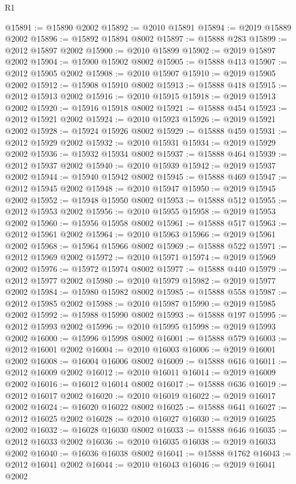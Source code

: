 \begin{lexlean}{R1}
\begin{coremodule}
@15891 := @15890 @2002
@15892 := @2010 @15891
@15894 := @2019 @15889 @2002
@15896 := @15892 @15894 @8002
@15897 := @15888 @283
@15899 := @2012 @15897 @2002
@15900 := @2010 @15899
@15902 := @2019 @15897 @2002
@15904 := @15900 @15902 @8002
@15905 := @15888 @413
@15907 := @2012 @15905 @2002
@15908 := @2010 @15907
@15910 := @2019 @15905 @2002
@15912 := @15908 @15910 @8002
@15913 := @15888 @418
@15915 := @2012 @15913 @2002
@15916 := @2010 @15915
@15918 := @2019 @15913 @2002
@15920 := @15916 @15918 @8002
@15921 := @15888 @454
@15923 := @2012 @15921 @2002
@15924 := @2010 @15923
@15926 := @2019 @15921 @2002
@15928 := @15924 @15926 @8002
@15929 := @15888 @459
@15931 := @2012 @15929 @2002
@15932 := @2010 @15931
@15934 := @2019 @15929 @2002
@15936 := @15932 @15934 @8002
@15937 := @15888 @464
@15939 := @2012 @15937 @2002
@15940 := @2010 @15939
@15942 := @2019 @15937 @2002
@15944 := @15940 @15942 @8002
@15945 := @15888 @469
@15947 := @2012 @15945 @2002
@15948 := @2010 @15947
@15950 := @2019 @15945 @2002
@15952 := @15948 @15950 @8002
@15953 := @15888 @512
@15955 := @2012 @15953 @2002
@15956 := @2010 @15955
@15958 := @2019 @15953 @2002
@15960 := @15956 @15958 @8002
@15961 := @15888 @517
@15963 := @2012 @15961 @2002
@15964 := @2010 @15963
@15966 := @2019 @15961 @2002
@15968 := @15964 @15966 @8002
@15969 := @15888 @522
@15971 := @2012 @15969 @2002
@15972 := @2010 @15971
@15974 := @2019 @15969 @2002
@15976 := @15972 @15974 @8002
@15977 := @15888 @440
@15979 := @2012 @15977 @2002
@15980 := @2010 @15979
@15982 := @2019 @15977 @2002
@15984 := @15980 @15982 @8002
@15985 := @15888 @558
@15987 := @2012 @15985 @2002
@15988 := @2010 @15987
@15990 := @2019 @15985 @2002
@15992 := @15988 @15990 @8002
@15993 := @15888 @197
@15995 := @2012 @15993 @2002
@15996 := @2010 @15995
@15998 := @2019 @15993 @2002
@16000 := @15996 @15998 @8002
@16001 := @15888 @579
@16003 := @2012 @16001 @2002
@16004 := @2010 @16003
@16006 := @2019 @16001 @2002
@16008 := @16004 @16006 @8002
@16009 := @15888 @616
@16011 := @2012 @16009 @2002
@16012 := @2010 @16011
@16014 := @2019 @16009 @2002
@16016 := @16012 @16014 @8002
@16017 := @15888 @636
@16019 := @2012 @16017 @2002
@16020 := @2010 @16019
@16022 := @2019 @16017 @2002
@16024 := @16020 @16022 @8002
@16025 := @15888 @641
@16027 := @2012 @16025 @2002
@16028 := @2010 @16027
@16030 := @2019 @16025 @2002
@16032 := @16028 @16030 @8002
@16033 := @15888 @646
@16035 := @2012 @16033 @2002
@16036 := @2010 @16035
@16038 := @2019 @16033 @2002
@16040 := @16036 @16038 @8002
@16041 := @15888 @1762
@16043 := @2012 @16041 @2002
@16044 := @2010 @16043
@16046 := @2019 @16041 @2002

\end{coremodule}
\end{lexlean}
